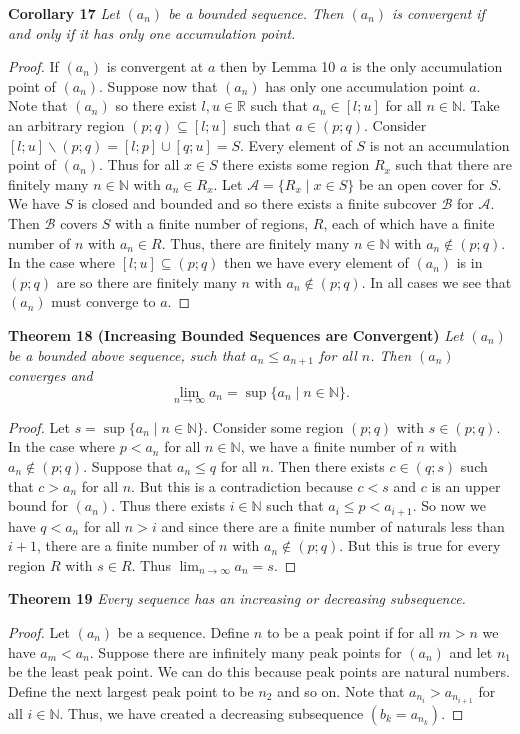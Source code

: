 \documentclass{article}
\begin{document}
\begin{flushleft}
\textbf{Corollary 17}
\textsl{Let $(a_n)$ be a bounded sequence. Then $(a_n)$ is convergent if and only if it has only one accumulation point.}
\begin{proof}
If $(a_n)$ is convergent at $a$ then by Lemma 10 $a$ is the only accumulation point of $(a_n)$. Suppose now that $(a_n)$ has only one accumulation point $a$. Note that $(a_n)$ so there exist $l,u \in \mathbb{R}$ such that $a_n \in [l;u]$ for all $n \in \mathbb{N}$. Take an arbitrary region $(p;q) \subseteq [l;u]$ such that $a \in (p;q)$. Consider $[l;u] \backslash (p;q) = [l;p] \cup [q;u] = S$. Every element of $S$ is not an accumulation point of $(a_n)$. Thus for all $x \in S$ there exists some region $R_x$ such that there are finitely many $n \in \mathbb{N}$ with $a_n \in R_x$. Let $\mathcal{A} = \{R_x \mid x \in S\}$ be an open cover for $S$. We have $S$ is closed and bounded and so there exists a finite subcover $\mathcal{B}$ for $\mathcal{A}$. Then $\mathcal{B}$ covers $S$ with a finite number of regions, $R$, each of which have a finite number of $n$ with $a_n \in R$. Thus, there are finitely many $n \in \mathbb{N}$ with $a_n \notin (p;q)$. In the case where $[l;u] \subseteq (p;q)$ then we have every element of $(a_n)$ is in $(p;q)$ are so there are finitely many $n$ with $a_n \notin (p;q)$. In all cases we see that $(a_n)$ must converge to $a$.
\end{proof}

\textbf{Theorem 18 (Increasing Bounded Sequences are Convergent)}
\textsl{Let $(a_n)$ be a bounded above sequence, such that $a_n \leq a_{n+1}$ for all $n$. Then $(a_n)$ converges and
\[
\lim_{n \rightarrow \infty} a_n = \sup \{a_n \mid n \in \mathbb{N}\}.
\]}
\begin{proof}
Let $s = \sup \{a_n \mid n \in \mathbb{N}\}$. Consider some region $(p;q)$ with $s \in (p;q)$. In the case where $p < a_n$ for all $n \in \mathbb{N}$, we have a finite number of $n$ with $a_n \notin (p;q)$. Suppose that $a_n \leq q$ for all $n$. Then there exists $c \in (q;s)$ such that $c > a_n$ for all $n$. But this is a contradiction because $c < s$ and $c$ is an upper bound for $(a_n)$. Thus there exists $i \in \mathbb{N}$ such that $a_i \leq p < a_{i+1}$. So now we have $q < a_n$ for all $n > i$ and since there are a finite number of naturals less than $i+1$, there are a finite number of $n$ with $a_n \notin (p;q)$. But this is true for every region $R$ with $s \in R$. Thus $\lim_{n \rightarrow \infty} a_n = s$.
\end{proof}

\textbf{Theorem 19}
\textsl{Every sequence has an increasing or decreasing subsequence.}
\begin{proof}
Let $(a_n)$ be a sequence. Define $n$ to be a peak point if for all $m>n$ we have $a_m < a_n$. Suppose there are infinitely many peak points for $(a_n)$ and let $n_1$ be the least peak point. We can do this because peak points are natural numbers. Define the next largest peak point to be $n_2$ and so on. Note that $a_{n_i} > a_{n_{i+1}}$ for all $i \in \mathbb{N}$. Thus, we have created a decreasing subsequence $(b_k = a_{n_k})$.\newline


\end{proof}
\end{flushleft}
\end{document}
